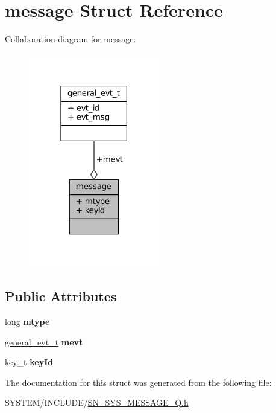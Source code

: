 \hypertarget{structmessage}{}\section{message Struct Reference}
\label{structmessage}


Collaboration diagram for message\+:\nopagebreak
\begin{figure}[H]
\begin{center}
\leavevmode
\includegraphics[width=162pt]{structmessage__coll__graph}
\end{center}
\end{figure}
\subsection*{Public Attributes}
\begin{DoxyCompactItemize}
\item 
\mbox{\label{structmessage_a9e469dd197785e3c791a15cbc10c8626}} 
long {\bfseries mtype}
\item 
\mbox{\label{structmessage_a5992d1a0e6bb72dbba0a1f3b08244fb3}} 
\hyperlink{structgeneral__evt__t}{general\+\_\+evt\+\_\+t} {\bfseries mevt}
\item 
\mbox{\label{structmessage_af91f82ff5041e8391e1954c3b8547ec6}} 
key\+\_\+t {\bfseries key\+Id}
\end{DoxyCompactItemize}


The documentation for this struct was generated from the following file\+:\begin{DoxyCompactItemize}
\item 
S\+Y\+S\+T\+E\+M/\+I\+N\+C\+L\+U\+D\+E/\hyperlink{SN__SYS__MESSAGE__Q_8h}{S\+N\+\_\+\+S\+Y\+S\+\_\+\+M\+E\+S\+S\+A\+G\+E\+\_\+\+Q.\+h}\end{DoxyCompactItemize}
